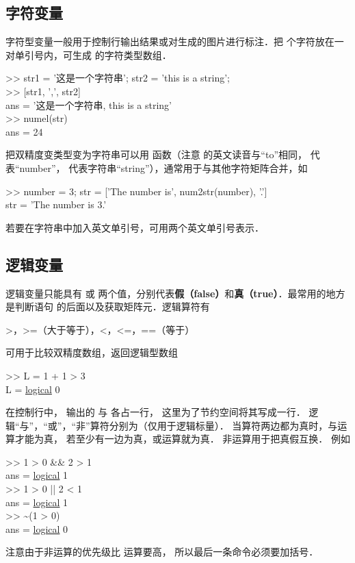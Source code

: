 \subsection{字符变量}

字符型变量一般用于控制行输出结果或对生成的图片进行标注．把  个字符放在一对单引号内，可生成  的字符类型数组．
\begin{Command}
>> str1 = {\color{string}'\!这是一个字符串'}; str2 = {\color{string}'this is a string'};\\
>> [str1, {\color{string}','}, str2] \\
ans = '\!这是一个字符串, this is a string'\\
>> numel(str) \\
ans = 24
\end{Command}
把双精度变类型变为字符串可以用  函数（注意  的英文读音与“to”相同，  代表“number”，  代表字符串“string”），通常用于与其他字符矩阵合并，如
\begin{Command}
>> number = 3; str = [{\color{string}'The number is'}, num2str(number), {\color{string}'.'}] \\
str = 'The number is 3.'
\end{Command}
若要在字符串中加入英文单引号，可用两个英文单引号表示．

\subsection{逻辑变量}

逻辑变量只能具有  或  两个值，分别代表\textbf{假（false）}和\textbf{真（true）}．最常用的地方是判断语句  的后面以及获取矩阵元．逻辑算符有
\begin{Command}
>，>=（大于等于），<，<=，==（等于）
\end{Command}
可用于比较双精度数组，返回逻辑型数组
\begin{Command}
>> L = 1 + 1 > 3 \\
L = {\color{blue}\underline{logical}} 0
\end{Command}
在控制行中， 输出的  与  各占一行， 这里为了节约空间将其写成一行． 逻辑“与”，“或”，“非”算符分别为（仅用于逻辑标量）． 当算符两边都为真时，与运算才能为真， 若至少有一边为真，或运算就为真． 非运算用于把真假互换． 例如
\begin{Command}
>> 1 > 0 \&\& 2 > 1 \\
ans = {\color{blue}\underline{logical}} 1\\
>> 1 > 0 || 2 < 1 \\
ans = {\color{blue}\underline{logical}} 1\\
>> \~ {}(1 > 0)\\
ans = {\color{blue}\underline{logical}} 0
\end{Command}
注意由于非运算的优先级比 \x{>} 运算要高， 所以最后一条命令必须要加括号．

